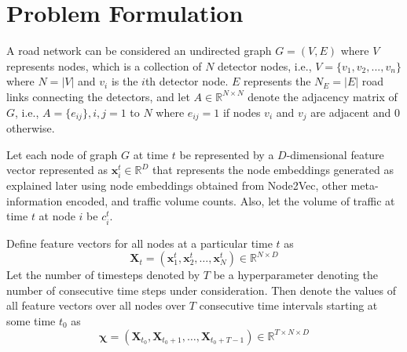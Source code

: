 \section{\textbf{Problem Formulation}}\label{sec:problem-for}

A road network can be considered an undirected graph $G = (V, E)$ where $V$ represents nodes, which is a collection of $N$ detector nodes, i.e., $V=\{v_1,v_2,...,v_n\}$ where $N = |V|$ and $v_i$ is the $i$th detector node. $E$ represents the $N_E = |E|$ road links connecting the detectors, and let $A \in \mathbb{R}^{N \times N}$ denote the adjacency matrix of $G$, i.e., $A = \{e_{ij}\}, i,j=1$ to $N$ where $e_{ij} = 1$ if nodes $v_i$ and $v_j$ are adjacent and $0$ otherwise.

Let each node of graph $G$ at time $t$ be represented by a $D$-dimensional feature vector represented as $\mathbf{x}_i^t \in \mathbb{R}^D$ that represents the node embeddings generated as explained later using node embeddings obtained from Node2Vec, other meta-information encoded, and traffic volume counts. Also, let the volume of traffic at time $t$ at node $i$ be $c_i^t$.

Define feature vectors for all nodes at a particular time $t$ as
\begin{equation*}
    \mathbf{X}_t = (\mathbf{x}_1^t, \mathbf{x}_2^t, \ldots, \mathbf{x}_N^t) \in \mathbb{R}^{N \times D} \tag{1}
\end{equation*}
Let the number of timesteps denoted by $T$ be a hyperparameter denoting the number of consecutive time steps under consideration. Then denote the values of all feature vectors over all nodes over $T$ consecutive time intervals starting at some time $t_0$ as
\begin{equation}
    \bm{\chi} = (\mathbf{X}_{t_0}, \mathbf{X}_{t_0+1}, \ldots, \mathbf{X}_{t_0+T-1}) \in \mathbb{R}^{T \times N \times D} \tag{2}
\end{equation}

